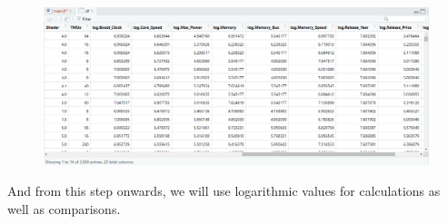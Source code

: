 \documentclass[a4paper]{article}
\begin{document}
\begin{figure}[H]
    \centering
    \includegraphics[keepaspectratio, width=1\textwidth, height=1\textheight]{Visualization/Transformation/1.png}
\end{figure}
And from this step onwards, we will use logarithmic values for calculations as well as comparisons.
\end{document}

